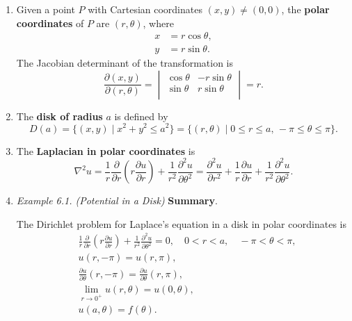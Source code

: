 \begin{enumerate}
    \item Given a point $P$ with Cartesian coordinates $(x,y) \neq (0,0)$, the \textbf{polar coordinates} of $P$ are $(r, \theta)$, where
    \begin{align*}
        x & = r\cos \theta, \\
        y & = r\sin \theta.
    \end{align*}
    The Jacobian determinant of the transformation is
    \[\frac{\partial (x,y)}{\partial (r,\theta)} = 
    \begin{vmatrix}
        \cos \theta & - r \sin \theta \\
        \sin \theta & r \sin \theta \\
    \end{vmatrix} = r.
    \]

    \newpage

     \item The \textbf{disk of radius} $a$ is defined by 
    \[D(a)=\{(x,y) \mid x^{2}+y^{2}\leq a^{2}\} = \{(r,\theta) \mid 0\leq r \leq a, \,-\pi \leq \theta \leq \pi\}.\]

    \item The \textbf{Laplacian in polar coordinates} is
    \[\nabla^{2} u = \frac{1}{r}\frac{\partial}{\partial r}\left( r\frac{\partial u}{\partial r} \right) +\frac{1}{r^{2}}\frac{\partial^{2} u}{\partial \theta^{2}} = \frac{\partial^{2} u}{\partial r^{2}} + \frac{1}{r}\frac{\partial u}{\partial r} + \frac{1}{r^{2}}\frac{\partial^{2} u}{\partial \theta^{2}}.\]


    \item \textit{Example 6.1. (Potential in a Disk)} \textbf{Summary}. 

    The Dirichlet problem for Laplace's equation in a disk in polar coordinates is
    \[
    \begin{aligned}
        & \frac{1}{r}\frac{\partial}{\partial r}\left( r\frac{\partial u}{\partial r} \right) +\frac{1}{r^{2}}\frac{\partial^{2} u}{\partial \theta^{2}} = 0, \quad 0 < r < a, \quad -\pi < \theta < \pi, \\
        & u(r, -\pi) = u(r, \pi), \\
        & \frac{\partial u}{\partial \theta}(r, -\pi) = \frac{\partial u}{\partial \theta}(r, \pi), \\
        & \lim_{r\to 0^{+}} u(r, \theta) = u(0, \theta), \\
        & u(a, \theta) = f (\theta).
    \end{aligned}
    \]

\end{enumerate}






